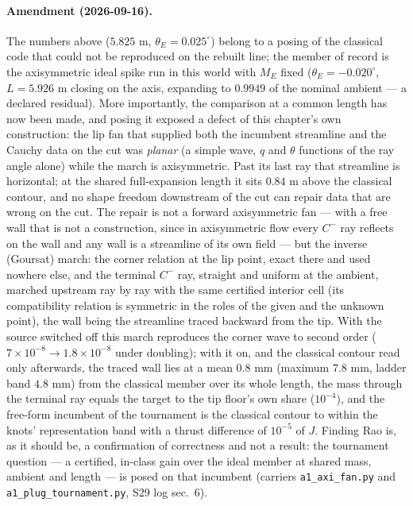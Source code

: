 \paragraph{Amendment (2026-09-16).} The numbers above ($5.825$ m,
$\theta_E = 0.025^{\circ}$) belong to a posing of the classical code that
could not be reproduced on the rebuilt line; the member of record is
the axisymmetric ideal spike run in this world with $M_E$ fixed
($\theta_E = -0.020^{\circ}$, $L = 5.926$ m closing on the axis,
expanding to $0.9949$ of the nominal ambient --- a declared residual).
More importantly, the comparison at a common length has now been made,
and posing it exposed a defect of this chapter's own construction: the
lip fan that supplied both the incumbent streamline and the Cauchy data
on the cut was \emph{planar} (a simple wave, $q$ and $\theta$ functions of
the ray angle alone) while the march is axisymmetric. Past its last
ray that streamline is horizontal; at the shared full-expansion length
it sits $0.84$ m above the classical contour, and no shape freedom
downstream of the cut can repair data that are wrong on the cut. The
repair is not a forward axisymmetric fan --- with a free wall that is
not a construction, since in axisymmetric flow every $C^-$ ray reflects
on the wall and any wall is a streamline of its own field --- but the
inverse (Goursat) march: the corner relation at the lip point, exact
there and used nowhere else, and the terminal $C^-$ ray, straight and
uniform at the ambient, marched upstream ray by ray with the same
certified interior cell (its compatibility relation is symmetric in
the roles of the given and the unknown point), the wall being the
streamline traced backward from the tip. With the source switched off
this march reproduces the corner wave to second order ($7\times10^{-8}
\to 1.8\times10^{-8}$ under doubling); with it on, and the classical
contour read only afterwards, the traced wall lies at a mean $0.8$ mm
(maximum $7.8$ mm, ladder band $4.8$ mm) from the classical member over
its whole length, the mass through the terminal ray equals the target
to the tip floor's own share ($10^{-4}$), and the free-form incumbent
of the tournament is the classical contour to within the knots'
representation band with a thrust difference of $10^{-5}$ of $J$.
Finding Rao is, as it should be, a confirmation of correctness and
not a result: the tournament question --- a certified, in-class gain
over the ideal member at shared mass, ambient and length --- is posed
on that incumbent (carriers \texttt{a1\_axi\_fan.py} and
\texttt{a1\_plug\_tournament.py}, S29 log sec.~6).

